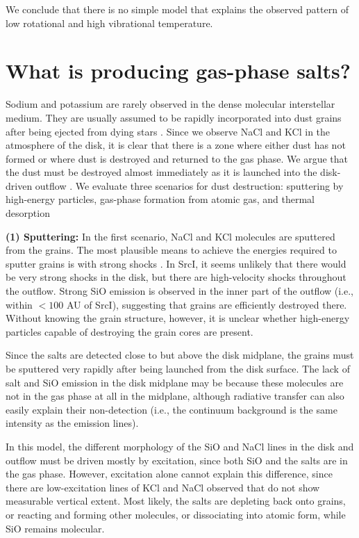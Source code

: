 \documentclass[12pt]{article}
\newcommand{\sourcei}{SrcI\xspace}
\begin{document}
We conclude that there is no simple model that explains the observed pattern of
low rotational and high vibrational temperature.



\section{What is producing gas-phase salts?}

Sodium and potassium are rarely observed in the dense molecular interstellar
medium.  They are usually assumed to be rapidly incorporated into dust grains
after being ejected from dying stars \cite[e.g.,][]{Milam2007a}.  Since we
observe NaCl and KCl in the atmosphere of the disk, it is clear that
there is a zone where either dust has not  formed or
where dust is destroyed and returned to the gas phase.  We argue that the dust
must be destroyed almost immediately as it is launched into the disk-driven
outflow \cite{Hirota2017a}. We evaluate three scenarios for dust destruction:
sputtering by high-energy particles, gas-phase formation from atomic gas, and
thermal desorption


\textbf{(1) Sputtering:}
In the first scenario, NaCl and KCl molecules are sputtered from the grains.
The most plausible means to achieve the energies required to sputter grains is
with strong shocks \cite{Schilke1997a,Decin2016a}.  In \sourcei, it seems
unlikely that there would be very strong shocks in the disk, but there are
high-velocity shocks throughout the outflow. Strong SiO emission is observed in
the inner part of the outflow (i.e., within $<100$ AU of \sourcei), suggesting
that grains are efficiently destroyed there.  Without knowing the grain
structure, however, it is unclear whether high-energy particles capable of
destroying the grain cores are present.

Since the salts are detected close to but above the disk midplane, the
grains must be sputtered very rapidly after being launched from the disk surface.
The lack of salt and SiO emission in the disk midplane may be because these
molecules are not in the gas phase at all in the midplane, although radiative
transfer can also easily explain their non-detection (i.e., the continuum
background is the same intensity as the emission lines).

In this model, the different morphology of the SiO and NaCl lines in the disk
and outflow must be driven mostly by excitation, since both SiO and the salts are
in the gas phase.  However, excitation alone cannot explain this difference,
since there are low-excitation lines of KCl and NaCl observed that do not
show measurable vertical extent.  Most likely, the salts are depleting back onto
grains, or reacting and forming other molecules, or dissociating into 
atomic form, while SiO remains molecular.
\end{document}
